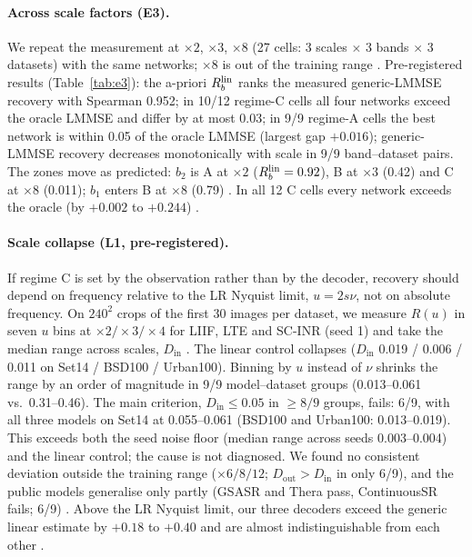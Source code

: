 \paragraph{Across scale factors (E3).} We repeat the measurement at
$\times2$, $\times3$, $\times8$ (27 cells: 3 scales $\times$ 3 bands $\times$
3 datasets) with the same networks; $\times8$ is out of the training range
. Pre-registered results (Table~\ref{tab:e3}): the a-priori
$R_b^{\mathrm{lin}}$ ranks the measured generic-LMMSE recovery with Spearman 0.952; in
10/12 regime-C cells all four networks exceed the oracle LMMSE and differ by
at most 0.03; in 9/9 regime-A cells the best network is within 0.05 of the
oracle LMMSE (largest gap $+0.016$); generic-LMMSE recovery decreases
monotonically with scale in 9/9 band--dataset pairs. The zones move as
predicted: $b_2$ is A at $\times2$ ($R_b^{\mathrm{lin}}=0.92$), B at $\times3$ (0.42) and
C at $\times8$ (0.011); $b_1$ enters B at $\times8$ (0.79)
. In all 12 C cells every network exceeds the oracle
(by $+0.002$ to $+0.244$) .

\paragraph{Scale collapse (L1, pre-registered).} If regime C is set by the
observation rather than by the decoder, recovery should depend on frequency
relative to the LR Nyquist limit, $u=2s\nu$, not on absolute frequency. On
$240^2$ crops of the first 30 images per dataset, we measure $R(u)$ in seven
$u$ bins at $\times2/\times3/\times4$ for LIIF, LTE and SC-INR (seed 1) and
take the median range across scales, $D_{\mathrm{in}}$ . The
linear control collapses ($D_{\mathrm{in}}$ 0.019 / 0.006 / 0.011 on Set14 /
BSD100 / Urban100). Binning by $u$ instead of $\nu$ shrinks the range by an
order of magnitude in 9/9 model--dataset groups (0.013--0.061 vs.\
0.31--0.46). The main criterion, $D_{\mathrm{in}}\le0.05$ in $\ge8/9$ groups,
fails: 6/9, with all three models on Set14 at 0.055--0.061 (BSD100 and
Urban100: 0.013--0.019). This exceeds both the seed noise floor (median range
across seeds 0.003--0.004) and the linear control; the cause is not
diagnosed. We found no consistent deviation outside the training range
($\times6/8/12$; $D_{\mathrm{out}}>D_{\mathrm{in}}$ in only 6/9), and the
public models generalise only partly (GSASR and Thera pass, ContinuousSR
fails; 6/9) \src{L1L2}. Above the LR Nyquist limit, our three decoders
exceed the generic linear estimate by $+0.18$ to $+0.40$ and are almost
indistinguishable from each other \src{L1L2}.

